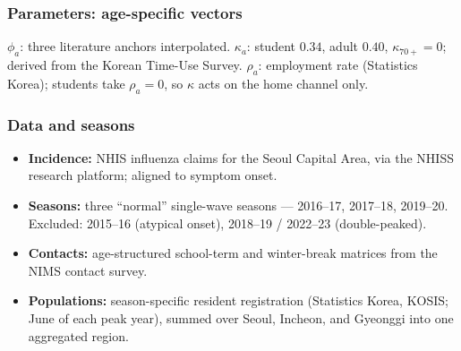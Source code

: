 \documentclass[dvipsnames, 10pt]{beamer}
\begin{document}
\begin{frame}\frametitle{Parameters: age-specific vectors}
    \centering
    \par\vspace{2mm}
    {\footnotesize $\phi_a$: three literature anchors interpolated. $\kappa_a$:
    student $0.34$, adult $0.40$, $\kappa_{70+}=0$; derived from the Korean Time-Use
    Survey. $\rho_a$: employment rate (Statistics Korea); students take
    $\rho_a=0$, so $\kappa$ acts on the home channel only.}
\end{frame}

\begin{frame}\frametitle{Data and seasons}
    \begin{itemize}
        \item \textbf{Incidence:} NHIS influenza claims for the Seoul Capital Area,
              via the NHISS research platform; aligned to symptom onset.
        \item \textbf{Seasons:} three ``normal'' single-wave seasons --- 2016--17,
              2017--18, 2019--20. Excluded: 2015--16 (atypical onset),
              2018--19 / 2022--23 (double-peaked).
        \item \textbf{Contacts:} age-structured school-term and winter-break
              matrices from the NIMS contact survey.
        \item \textbf{Populations:} season-specific resident registration
              (Statistics Korea, KOSIS; June of each peak year), summed over Seoul,
              Incheon, and Gyeonggi into one aggregated region.
    \end{itemize}
\end{frame}
\end{document}
